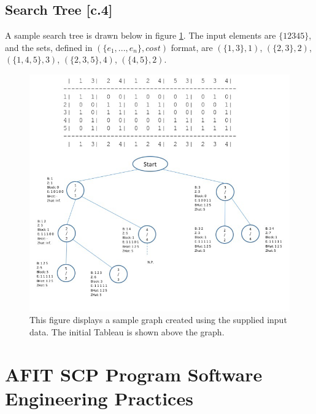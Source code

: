 \documentclass[12pt]{article}
\begin{document}
	\subsection{Search Tree [c.4]}
	
	A sample search tree is drawn below in figure \ref{fig:samplegraph}. The input elements are $\{1 2 3 4 5\}$, and the sets, defined in $(\{e_1,...,e_n\}, cost)$ format, are $(\{1, 3\},1)$,
	$(\{2, 3\},2)$,
	$(\{1, 4, 5\},3)$,
	$(\{2, 3, 5\},4)$,
	$(\{4, 5\}, 2)$.
	
	\begin{figure}[ht!] \label{fig:samplegraph}
		
		
		\centering
		\includegraphics[width = 5.5in]{graph1.png}
		
		
		\caption{This figure displays a sample graph created using the supplied input data. The initial Tableau is shown above the graph.}
		
		
	\end{figure}
	
	\section{AFIT SCP Program Software Engineering Practices} \label{scn:design}
	
\end{document}
